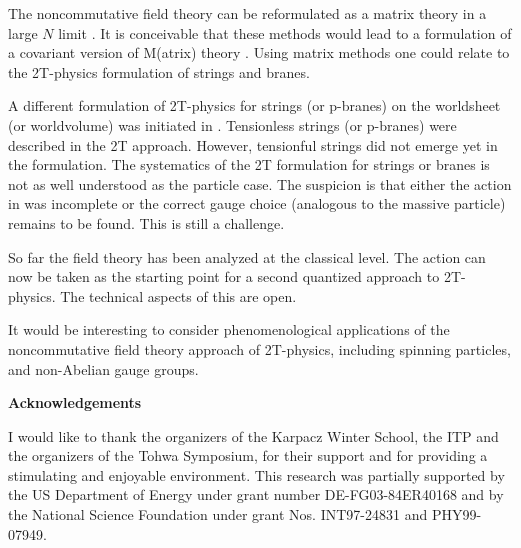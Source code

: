 \documentclass[a4paper,12pt]{article}
\begin{document}
The noncommutative field theory can be reformulated as a matrix theory in a
large $N$ limit \cite{NCu11}. It is conceivable that these methods would
lead to a formulation of a covariant version of M(atrix) theory \cite{BFSS}.
Using matrix methods one could relate to the 2T-physics formulation of
strings and branes.

A different formulation of 2T-physics for strings (or p-branes) on
the worldsheet (or worldvolume) was initiated in \cite{string2t}.
Tensionless strings (or p-branes) were described in the 2T
approach. However, tensionful strings did not emerge yet in the
formulation. The systematics of the 2T formulation for strings or
branes is not as well understood as the particle case. The
suspicion is that either the action in \cite{string2t} was
incomplete or the correct gauge choice (analogous to the massive
particle) remains to be found. This is still a challenge.

So far the field theory has been analyzed at the classical level. The action
can now be taken as the starting point for a second quantized approach to
2T-physics. The technical aspects of this are open.

It would be interesting to consider phenomenological applications of the
noncommutative field theory approach of 2T-physics, including spinning
particles, and non-Abelian gauge groups.

\bigskip

{\bf Acknowledgements}
\medskip

I would like to thank the organizers of the Karpacz Winter School,
the ITP and the organizers of the Tohwa Symposium, for their
support and for providing a stimulating and enjoyable environment.
This research was partially supported by the US Department of
Energy under grant number DE-FG03-84ER40168 and by the National
Science Foundation under grant Nos. INT97-24831 and PHY99-07949.
\end{document}
